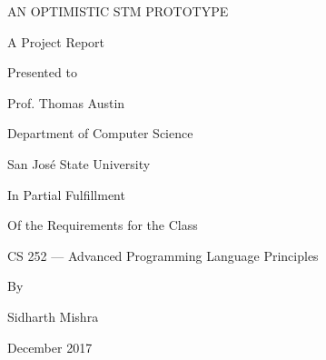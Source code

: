 \documentclass[../main]{subfiles}
\begin{document}
\begin{titlepage}
  \centering
  \par\vspace{1.5in}
  {\LARGE AN OPTIMISTIC STM PROTOTYPE \par}
  \vspace{0.75in}
  {A Project Report \par}
  \vspace{1in}
  {Presented to \par}
  \vspace{0.15in}
  {Prof. Thomas Austin \par}
  \vspace{0.15in}
  {Department of Computer Science \par}
  \vspace{0.15in}
  {San Jos\'e State University \par}
  \vspace{1in}
  {In Partial Fulfillment \par}
  \vspace{0.15in}
  {Of the Requirements for the Class \par}
  \vspace{0.15in}
  {CS 252 --- Advanced Programming Language Principles \par}
  \vspace{1in}
  {By \par}
  \vspace{0.15in}
  {Sidharth Mishra \par}
  \vspace{0.15in}
  {December 2017}
  \vfill
  \par
\end{titlepage}
\end{document}
